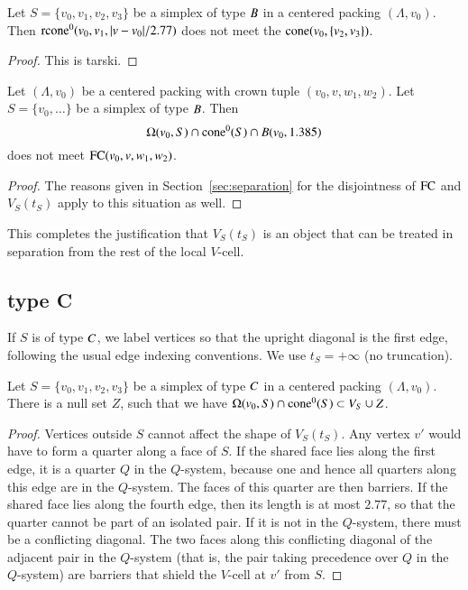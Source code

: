 \begin{lemma}
 Let $S=\{v_0,v_1,v_2,v_3\}$ be a simplex of type $B$ in a centered packing $(\Lambda,v_0)$.
Then  ${\operatorname{rcone}}^0(v_0,v_1,|v-v_0|/2.77)$ does not meet the
${\operatorname{cone}}(v_0,\{v_2,v_3\})$.
\end{lemma}

\begin{proof} This is tarski.
\end{proof}

\begin{lemma} 
Let $(\Lambda,v_0)$ be a centered packing with crown tuple $(v_0,v,w_1,w_2)$.
Let $S=\{v_0,\ldots\}$ be a simplex of type $B$. Then
$$\Omega(v_0,S) \cap {\operatorname{cone}}^0(S) \cap B(v_0,1.385)$$
does not meet ${\operatorname{FC}}(v_0,v,w_1,w_2)$.
\end{lemma}

\begin{proof}
The reasons given in Section~\ref{sec:separation} for the
disjointness of ${\operatorname{FC}}$ and $V_S(t_S)$ apply to this
situation as well.
\end{proof}


This completes the justification that
$V_S(t_S)$ is an object that can be treated in separation from the
rest of the local $V$-cell.

\subsection{type C}%

If $S$ is of type $C$, we label vertices so that
the upright diagonal is the first edge, following the usual
edge indexing conventions.  We use $t_S =+\infty$ (no
truncation).   

\begin{lemma}
Let $S=\{v_0,v_1,v_2,v_3\}$ be a simplex of type $C$ in a centered packing
$(\Lambda,v_0)$.
There is a null set $Z$, such that
we have  $ \Omega(v_0,S) \cap {\operatorname{cone}}^0(S) \subset V_S \cup Z$.
\end{lemma}

\begin{proof}  %
Vertices outside $S$ cannot affect the shape of $V_S(t_S)$.  Any
vertex $v'$ would have to form a quarter along a face of $S$.  If
the shared face lies along the first edge, it is a quarter $Q$ in
the $Q$-system, because one and hence all quarters along this edge
are in the $Q$-system.  The faces of this quarter are then
barriers. If the shared face lies along the fourth edge, then its
length is at most $2.77$, so that the quarter cannot be part of an
isolated pair. If it is not in the $Q$-system, there must be a
conflicting diagonal. The two faces along this conflicting
diagonal of the adjacent pair in the $Q$-system (that is, the pair
taking precedence over $Q$ in the $Q$-system) are barriers that
shield the $V$-cell at $v'$ from $S$.
\end{proof}


